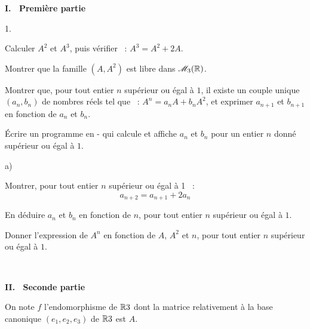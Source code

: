 \documentclass[11pt]{article}%
\begin{document}
\textbf{I.~ Première partie}

\begin{noliste}{1.}
 \setlength{\itemsep}{4mm}
\item Calculer $A^{2}$ et $A^{3}$, puis vérifier~ : $A^{3} = A^{2} +
2A$.

\item Montrer que la famille $\left( {A,A^{2}}\right) $ est libre dans
$\mathscr{M}_{3}(\mathbb{R}) $.

\item Montrer que, pour tout entier $n$ supérieur ou égal à $1$, il
existe un couple unique $\left( {a_{n},b_{n}}\right) $ de nombres
réels tel que~ : $A^{n} = a_{n}A + b_{n}A^{2}$, et exprimer $a_{n + 1}$
et $b_{n + 1}$ en fonction de $a_{n}$ et $b_{n}$.

\item Écrire un programme en -\Scilab{} qui calcule et affiche $a_{n}$
et $b_{n}$ pour un entier $n$ donné supérieur ou égal à $1$.

\item 
\begin{noliste}{a)}
 \setlength{\itemsep}{2mm}
\item Montrer, pour tout entier $n$ supérieur ou égal à 1~ : 
\[
a_{n + 2} = a_{n + 1} + 2a_{n}
\]

\item En déduire $a_{n}$ et $b_{n}$ en fonction de $n$, pour tout
entier $n$ supérieur ou égal à $1$.

\item Donner l'expression de $A^{n}$ en fonction de $A$, $A^{2}$ et
$n$,
pour tout entier $n$ supérieur ou égal à $1$.
\end{noliste}
\end{noliste}

{\large \ ~}

\textbf{\noindent II.~ Seconde partie}

On note $f$ l'endomorphisme de $\Bbb{R}{3}$ dont la matrice
relativement
à la base canonique $\left( {e_{1},e_{2},e_{3}}\right) $ de
$\Bbb{R}{3}$ est $A$.
\end{document}

